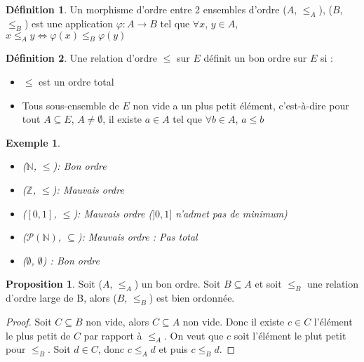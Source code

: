 \documentclass{article}
\theoremstyle{definition}
\newtheorem{definition}{Définition}
\theoremstyle{definition}
\newtheorem{prop}{Proposition}
\theoremstyle{definition}
\theoremstyle{plain}
\newtheorem{example}{Exemple}
\theoremstyle{theorem}
\theoremstyle{theorem}
\begin{document}
\begin{definition}

    Un morphisme d'ordre entre 2 ensembles d'ordre ($A$, $\leqslant_A$), ($B$, $\leqslant_B$) est une application $\varphi : A \to B$
    tel que $\forall x$, $y\in A$, $x \leqslant_A y \iff \varphi(x) \leqslant_B \varphi(y)$

\end{definition}

\begin{definition}

    Une relation d'ordre $\leqslant$ sur $E$ définit un bon ordre sur $E$ si :
    \begin{itemize}
        \item $\leqslant$ est un ordre total
        \item Tous sous-ensemble de $E$ non vide a un plus petit élément, c'est-à-dire pour tout $A \subseteq E$, $A \neq \emptyset$, il existe
            $a \in A$ tel que $\forall b \in A$, $a \leqslant b$
    \end{itemize}

\end{definition}

\begin{example}
    \begin{itemize}
        \item ($\mathbb{N}$, $\leqslant$): Bon ordre
        \item ($\mathbb{Z}$, $\leqslant$): Mauvais ordre
        \item ($[0, 1]$, $\leqslant$): Mauvais ordre ($]0, 1]$ n'admet pas de minimum)
        \item ($\mathscr{P}(\mathbb{N})$, $\subseteq$): Mauvais ordre : Pas total
        \item ($\emptyset$, $\emptyset$) : Bon ordre
    \end{itemize} 
\end{example}

\begin{prop}
    Soit ($A$, $\leqslant_A$) un bon ordre. Soit $B \subseteq A$ et soit $\leqslant_B$ une relation d'ordre large de B, alors ($B$, $\leqslant_B$) est bien ordonnée.
\end{prop}

\begin{proof}

    Soit $C \subseteq B$ non vide, alors $C \subseteq A$ non vide. Donc il existe $c \in C$ l'élément le plus petit de $C$ par rapport à $\leqslant_A$. On
    veut que $c$ soit l'élément le plut petit pour $\leqslant_B$. Soit $d \in C$, donc $c \leqslant_A d$ et puis $c \leqslant_B d$.

\end{proof}
\end{document}
